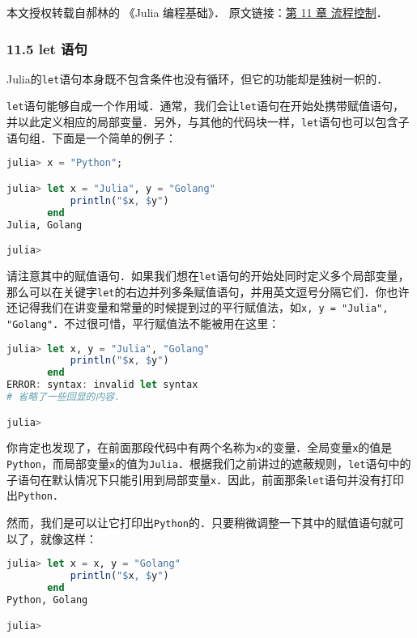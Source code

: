 
本文授权转载自郝林的 《Julia 编程基础》． 原文链接：\href{https://github.com/hyper0x/JuliaBasics/blob/master/book/ch11.md}{第 11 章 流程控制}．


\subsubsection{11.5 let 语句}

Julia的\verb|let|语句本身既不包含条件也没有循环，但它的功能却是独树一帜的．

\verb|let|语句能够自成一个作用域．通常，我们会让\verb|let|语句在开始处携带赋值语句，并以此定义相应的局部变量．另外，与其他的代码块一样，\verb|let|语句也可以包含子语句组．下面是一个简单的例子：

\begin{lstlisting}[language=julia]
julia> x = "Python";

julia> let x = "Julia", y = "Golang"
           println("$x, $y")
       end
Julia, Golang

julia> 
\end{lstlisting}

请注意其中的赋值语句．如果我们想在\verb|let|语句的开始处同时定义多个局部变量，那么可以在关键字\verb|let|的右边并列多条赋值语句，并用英文逗号分隔它们．你也许还记得我们在讲变量和常量的时候提到过的平行赋值法，如\verb|x, y = "Julia", "Golang"|．不过很可惜，平行赋值法不能被用在这里：

\begin{lstlisting}[language=julia]
julia> let x, y = "Julia", "Golang"
           println("$x, $y")
       end
ERROR: syntax: invalid let syntax
# 省略了一些回显的内容．

julia> 
\end{lstlisting}

你肯定也发现了，在前面那段代码中有两个名称为\verb|x|的变量．全局变量\verb|x|的值是\verb|Python|，而局部变量\verb|x|的值为\verb|Julia|．根据我们之前讲过的遮蔽规则，\verb|let|语句中的子语句在默认情况下只能引用到局部变量\verb|x|．因此，前面那条\verb|let|语句并没有打印出\verb|Python|．

然而，我们是可以让它打印出\verb|Python|的．只要稍微调整一下其中的赋值语句就可以了，就像这样：

\begin{lstlisting}[language=julia]
julia> let x = x, y = "Golang"
           println("$x, $y")
       end
Python, Golang

julia> 
\end{lstlisting}

